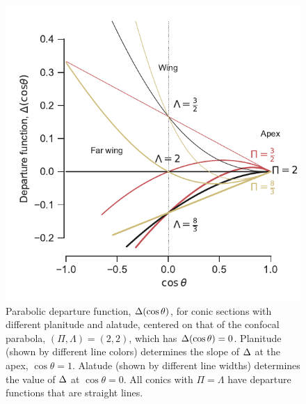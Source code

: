 \begin{figure}
  \includegraphics[width=\linewidth]{figs/conic-departure}
  \caption[]{Parabolic departure function, \(\operatorname{\Delta}(\cos\theta)\), for
    conic sections with different planitude and alatude, centered on
    that of the confocal parabola, \((\Pi, \Lambda) = (2, 2)\), which has
    \(\operatorname{\Delta}(\cos\theta) = 0\).  Planitude (shown by different line
    colors) determines the slope of \(\operatorname{\Delta}\) at the apex,
    \(\cos\theta = 1\).  Alatude (shown by different line widths)
    determines the value of \(\operatorname{\Delta}\) at \(\cos\theta = 0\).  All conics
    with \(\Pi = \Lambda\) have departure functions that are straight lines.}
  \label{fig:conic-departure}
\end{figure}

